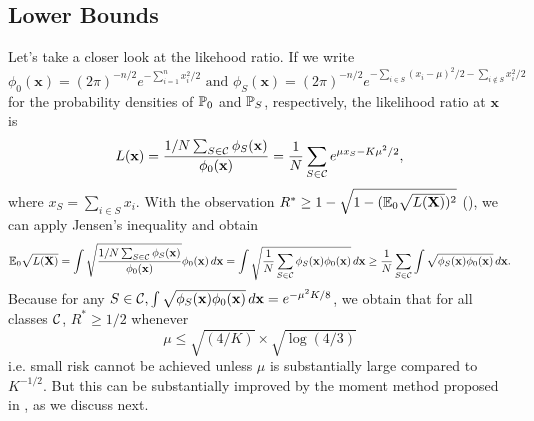 \documentclass[10pt, oneside]{article}
\begin{document}
\subsection{Lower Bounds}
Let's take a closer look at the likehood ratio. If we write 
$$\phi_0(\mathbf{x}) = (2\pi)^{-n/2} e^{-\sum_{i=1}^n x_i^2/2} \text{ and }
\phi_S(\mathbf{x}) = (2\pi)^{-n/2} e^{-\sum_{i\in S}(x_i-\mu)^2/2-\sum_{i\notin S} x_i^2/2}$$
for the probability densities of $\mathbb{P}_0$ and $\mathbb{P}_S$, respectively, the likelihood ratio at $\mathbf{x}$ is
\begin{equation}
  \label{eq: likelihood ratio}
  L(\mathbf{x}) = \frac{{1/N}\sum_{S\in{\mathcal C}} \phi_S(\mathbf{x})}{\phi_0(\mathbf{x})} = \frac{1}{N} \sum_{S\in{\mathcal C}} e^{\mu x_S - K\mu^2/2},
\end{equation}
where $x_S = \sum_{i\in S} x_i$. With the observation $R^* \ge 1 - \sqrt{1 - (\mathbb{E}_0 \sqrt{L(\mathbf{X})})^2}$ (\cite{devroye2013probabilistic}),
we can apply Jensen's inequality and obtain 
$$\mathbb{E}_0 \sqrt{L(\mathbf{X})} = \int\sqrt{\frac{{1/N}\sum_{S\in{\mathcal C}} \phi_S(\mathbf{x})}{\phi_0(\mathbf{x})}} \phi_0(\mathbf{x}) \,d\mathbf{x} = \int\sqrt{\frac{1}{N} \sum_{S\in{\mathcal C}} \phi_S(\mathbf{x}) \phi_0(\mathbf{x})} \,d\mathbf{x}\ge\frac{1}{N} \sum_{S\in{\mathcal C}}
\int\sqrt{ \phi_S(\mathbf{x}) \phi_0(\mathbf{x})} \,d\mathbf{x}.$$ 
Because for any $S\in{\mathcal C}, \int\sqrt{ \phi_S(\mathbf{x}) \phi_0(\mathbf{x})} \,d\mathbf{x}=e^{-\mu^2K/8}$, we obtain that for all classes ${\mathcal C}$, $R^* \ge1/2$ whenever
\begin{equation}
  \label{eq: loose lower bound}
  \mu\le\sqrt{(4/K)}\times\sqrt{\log(4/3)}
\end{equation}
i.e. small risk cannot be achieved unless $\mu$ is substantially large compared to $K^{-1/2}$. But this can be substantially improved by the moment method proposed in \cite{addario2010combinatorial}, as we discuss next.
\end{document}
